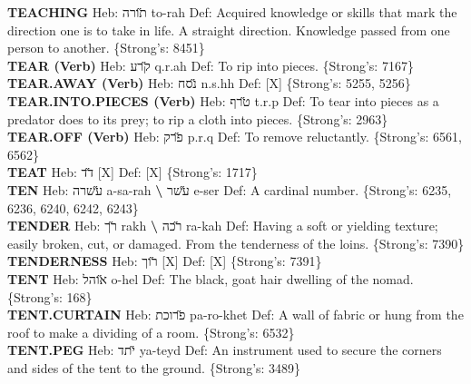 {\textbf{TEACHING} Heb: {\large\H תורה} to-rah Def: Acquired knowledge or skills that mark the direction one is to take in life. A straight direction. Knowledge passed from one person to another. \{Strong's: 8451\}\hfill{}\\

\textbf{TEAR (Verb)} Heb: {\large\H קרע} q.r.ah Def: To rip into pieces. \{Strong's: 7167\}\hfill{}\\

\textbf{TEAR.AWAY (Verb)} Heb: {\large\H נסח} n.s.hh Def: {[}X{]} \{Strong's: 5255, 5256\}\hfill{}\\

\textbf{TEAR.INTO.PIECES (Verb)} Heb: {\large\H טרף} t.r.p Def: To tear into pieces as a predator does to its prey; to rip a cloth into pieces. \{Strong's: 2963\}\hfill{}\\

\textbf{TEAR.OFF (Verb)} Heb: {\large\H פרק} p.r.q Def: To remove reluctantly. \{Strong's: 6561, 6562\}\hfill{}\\

\textbf{TEAT} Heb: {\large\H דד} {[}X{]} Def: {[}X{]} \{Strong's: 1717\}\hfill{}\\

\textbf{TEN} Heb: {\large\H עשרה} a-sa-rah \textbf{\textbackslash{}} {\large\H עשר} e-ser Def: A cardinal number. \{Strong's: 6235, 6236, 6240, 6242, 6243\}\hfill{}\\

\textbf{TENDER} Heb: {\large\H רך} rakh \textbf{\textbackslash{}} {\large\H רכה} ra-kah Def: Having a soft or yielding texture; easily broken, cut, or damaged. From the tenderness of the loins. \{Strong's: 7390\}\hfill{}\\

\textbf{TENDERNESS} Heb: {\large\H רוך} {[}X{]} Def: {[}X{]} \{Strong's: 7391\}\hfill{}\\

\textbf{TENT} Heb: {\large\H אוהל} o-hel Def: The black, goat hair dwelling of the nomad. \{Strong's: 168\}\hfill{}\\

\textbf{TENT.CURTAIN} Heb: {\large\H פרוכת} pa-ro-khet Def: A wall of fabric or hung from the roof to make a dividing of a room. \{Strong's: 6532\}\hfill{}\\

\textbf{TENT.PEG} Heb: {\large\H יתד} ya-teyd Def: An instrument used to secure the corners and sides of the tent to the ground. \{Strong's: 3489\}\hfill{}\\

}
